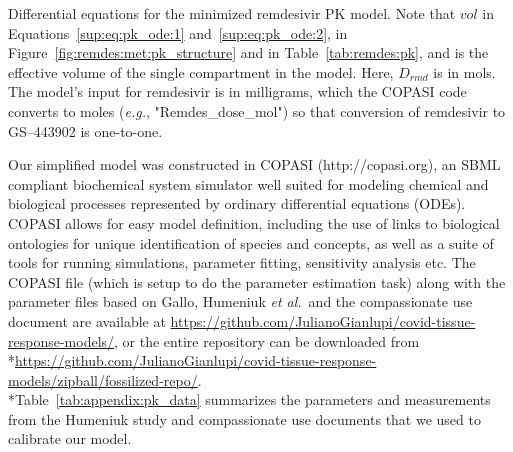 
\noindent Differential equations for the minimized remdesivir PK model. Note that $vol$ in Equations~\ref{sup:eq:pk_ode:1} and~\ref{sup:eq:pk_ode:2}, in Figure~\ref{fig:remdes:met:pk_structure} and in Table~\ref{tab:remdes:pk}, and is the effective volume of the single compartment in the model. Here, $D_{rmd}$ is in mols. The model's input for remdesivir is in milligrams, which the COPASI code converts to moles (\emph{e.g.}, "Remdes\_dose\_mol") so that conversion of remdesivir to GS--443902 is one-to-one.

Our simplified model was constructed in COPASI (http://copasi.org), an SBML compliant biochemical system simulator well suited for modeling chemical and biological processes represented by ordinary differential equations (ODEs). COPASI allows for easy model definition, including the use of links to biological ontologies for unique identification of species and concepts, as well as a suite of tools for running simulations, parameter fitting, sensitivity analysis etc. The COPASI file (which is setup to do the parameter estimation task) along with the parameter files based on Gallo, Humeniuk \emph{et al.}\ and the compassionate use document are available at \href{https://github.com/JulianoGianlupi/covid-tissue-response-models/}{https://github.com/JulianoGianlupi/covid-tissue-response-models/}, or the entire repository can be downloaded from  \\*\href{https://github.com/JulianoGianlupi/covid-tissue-response-models/zipball/fossilized-repo/}{https://github.com/JulianoGianlupi/covid-tissue-response-models/zipball/fossilized-repo/}. \\*Table~\ref{tab:appendix:pk_data} summarizes the parameters and measurements from the Humeniuk study and compassionate use documents that we used to calibrate our model.

